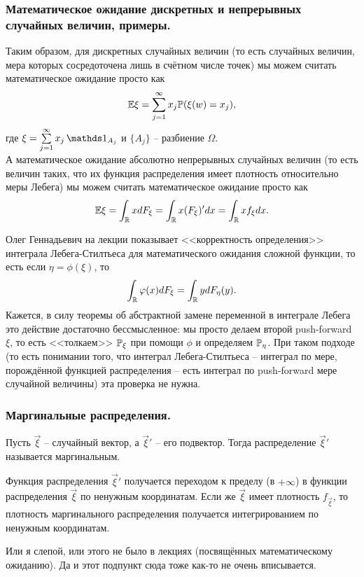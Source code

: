 \subsubsection{Математическое ожидание дискретных и непрерывных случайных величин, примеры.}
Таким образом, для дискретных случайных величин (то есть случайных величин, мера которых сосредоточена лишь в счётном числе точек) мы можем считать математическое ожидание просто как 
\[
    \Ex \xi = \sum\limits_{j = 1}^{\infty} x_j \P(\xi(w) = x_j),
\]
где $\xi = \sum\limits_{j = 1}^{\infty} x_j\Ind_{A_j}$ и $\{A_j\}$ -- разбиение $\Omega$. \\
А математическое ожидание абсолютно непрерывных случайных величин (то есть величин таких, что их функция распределения имеет плотность относительно меры Лебега) мы можем считать математическое ожидание просто как 
\[
    \Ex \xi = \int_{\R} xdF_{\xi} = \int_{\R}x (F_{\xi})'dx = \int_{\R}xf_{\xi}dx.
\]
\begin{note}
    Олег Геннадьевич на лекции показывает <<корректность определения>> интеграла Лебега-Стилтьеса для математического ожидания сложной функции, то есть если $\eta = \phi(\xi)$, то
    \[
        \int_{\R}\phi(x)dF_{\xi} = \int_{\R} ydF_{\eta}(y).
    \]
    Кажется, в силу теоремы об абстрактной замене переменной в интеграле Лебега это действие достаточно бессмысленное: мы просто делаем второй push-forward $\xi$, то есть <<толкаем>> $\P_\xi$ при помощи $\phi$ и определяем $\P_\eta$. При таком подходе (то есть понимании того, что интеграл Лебега-Стилтьеса -- интеграл по мере, порождённой функцией распределения -- есть интеграл по push-forward мере случайной величины) эта проверка не нужна.
\end{note}
\subsubsection{Маргинальные распределения.}
\begin{definition}
    Пусть $\vec{\xi}$ -- случайный вектор, а $\vec{\xi}'$ -- его подвектор. Тогда распределение $\vec{\xi}'$ называется маргинальным.
\end{definition}
Функция распределения $\vec{\xi}'$ получается переходом к пределу (в $+\infty$) в функции распределения $\vec{\xi}$ по ненужным координатам. Если же $\vec{\xi}$ имеет плотность $f_{\vec{\xi}}$, то плотность маргинального распределения получается интегрированием по ненужным координатам.
\begin{note}
    Или я слепой, или этого не было в лекциях (посвящённых математическому ожиданию). Да и этот подпункт сюда тоже как-то не очень вписывается.
\end{note}